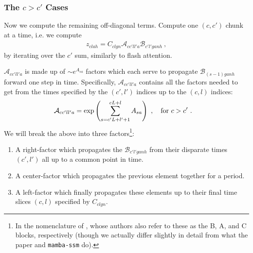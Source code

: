 \subsubsection{The $ c>c'  $ Cases}

Now we compute the remaining off-diagonal terms. Compute one $ (c, c') $ chunk at a time, i.e. we
compute
\begin{align}
    z_{ clah }= C _{ clgn }\mathcal{A}_{ cc'll'a }\mathcal{B}_{ c'l'ganh } \ , \label{app_eq_mamba2_off_diag_chunk}
\end{align}
by iterating over the $ c' $ sum, similarly to flash attention.

$ \mathcal{A}_{ cc'll'a } $ is made up of $\sim  e^{ A_{ sa  } } $ factors which each serve to
propagate $ \mathcal{B }_{ (s-1)ganh } $ forward one step in time. Specifically, $ \mathcal{A}_{
cc'll'a }$ contains all the factors needed to get from the times specified by the $ (c', l') $
indices up to the $ (c, l ) $ indices:
\begin{align}
    \mathcal{A}_{ cc'll'a } &=\exp \left ( \sum_{ s= c'L + l' + 1 }^{ cL + l  }A _{ sa } \right ) \ , \quad {\rm for}\  c>c' \ .
\end{align}
We will break the above into three factors\footnote{In the nomenclature of
\cite{dao2024transformersssmsgeneralizedmodels}, whose authors also refer to these as the B, A, and
C blocks, respectively (though we actually differ slightly in detail from what the paper and
\texttt{mamba-ssm} do).}:
\begin{enumerate}
    \item A right-factor which propagates the $ \mathcal{B}_{ c'l'ganh } $ from their disparate
        times $ (c', l') $ all up to a common point in time.
    \item A center-factor which propagates the previous element together for a period.
    \item A left-factor which finally propagates these elements up to their final time slices $ (c,
        l) $ specified by $ C _{ clgn } $.
\end{enumerate}

